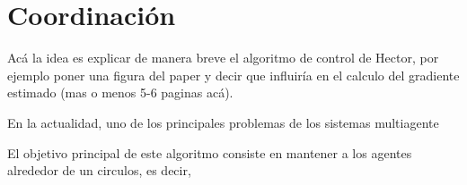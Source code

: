 \newpage
\thispagestyle{empty}
\mbox{}

\chapter{Coordinación}
\label{ch:chapter4}

Acá la idea es explicar de manera breve el algoritmo de control de Hector, por ejemplo poner una figura del paper y decir que influiría en el calculo del gradiente estimado (mas o menos 5-6 paginas acá).

En la actualidad, uno de los principales problemas de los sistemas multiagente

El objetivo principal de este algoritmo consiste en mantener a los agentes alrededor de un circulos, es decir, 